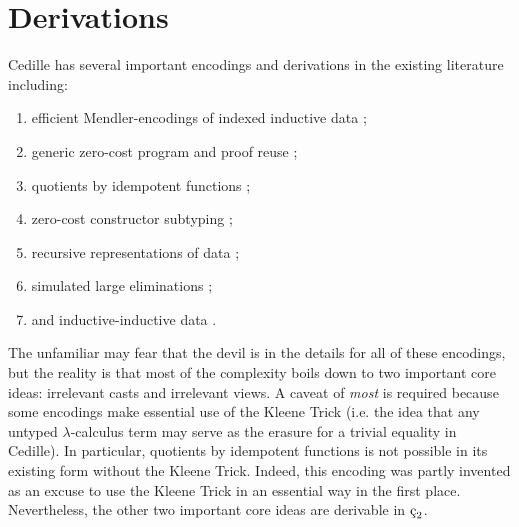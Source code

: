 \section{Derivations}

Cedille has several important encodings and derivations in the existing literature including:
\begin{enumerate}
    \item efficient Mendler-encodings of indexed inductive data \cite{firsov2018_mendler};
    \item generic zero-cost program and proof reuse \cite{diehl2018_generic_reuse};
    \item quotients by idempotent functions \cite{marmaduke2020quotients};
    \item zero-cost constructor subtyping \cite{marmaduke2020_constructor_subtyping};
    \item recursive representations of data \cite{jenkins2021monotone_recursive_types};
    \item simulated large eliminations \cite{jenkins2021_large_elim};
    \item and inductive-inductive data \cite{marmaduke2023_indind}.
\end{enumerate}
The unfamiliar may fear that the devil is in the details for all of these encodings, but the reality is that most of the complexity boils down to two important core ideas: irrelevant casts and irrelevant views.
A caveat of \textit{most} is required because some encodings make essential use of the Kleene Trick (i.e. the idea that any untyped $\lambda$-calculus term may serve as the erasure for a trivial equality in Cedille).
In particular, quotients by idempotent functions is not possible in its existing form without the Kleene Trick.
Indeed, this encoding was partly invented as an excuse to use the Kleene Trick in an essential way in the first place.
Nevertheless, the other two important core ideas are derivable in $\ced$.

